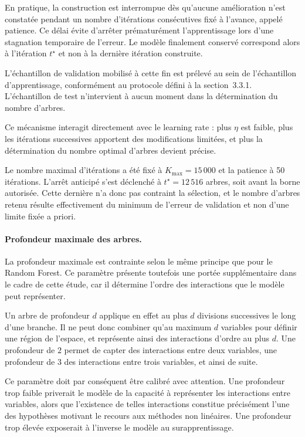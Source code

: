 En pratique, la construction est interrompue dès qu'aucune amélioration n'est constatée 
pendant un nombre d'itérations consécutives fixé à l'avance, appelé patience. Ce délai 
évite d'arrêter prématurément l'apprentissage lors d'une stagnation temporaire de 
l'erreur. Le modèle finalement conservé correspond alors à l'itération $t^{\star}$ et non 
à la dernière itération construite.

L'échantillon de validation mobilisé à cette fin est prélevé au sein de l'échantillon 
d'apprentissage, conformément au protocole défini à la section~3.3.1. L'échantillon de 
test n'intervient à aucun moment dans la détermination du nombre d'arbres.

Ce mécanisme interagit directement avec le learning rate : plus $\eta$ est 
faible, plus les itérations successives apportent des modifications limitées, et plus la 
détermination du nombre optimal d'arbres devient précise.

Le nombre maximal d'itérations a été fixé à \(K_{\max} = 15\,000\) et la
patience à 50 itérations. L'arrêt anticipé s'est déclenché à
\(t^{\star} = 12\,516\) arbres, soit avant la borne autorisée. Cette dernière
n'a donc pas contraint la sélection, et le nombre d'arbres retenu résulte
effectivement du minimum de l'erreur de validation et non d'une limite fixée
a priori.

\paragraph{Profondeur maximale des arbres.}
La profondeur maximale est contrainte selon le même principe que pour le Random Forest. 
Ce paramètre présente toutefois une portée supplémentaire dans le cadre de cette étude, 
car il détermine l'ordre des interactions que le modèle peut représenter.

Un arbre de profondeur $d$ applique en effet au plus $d$ divisions successives le long 
d'une branche. Il ne peut donc combiner qu'au maximum $d$ variables pour définir une 
région de l'espace, et représente ainsi des interactions d'ordre au plus $d$. Une 
profondeur de $2$ permet de capter des interactions entre deux variables, une profondeur 
de $3$ des interactions entre trois variables, et ainsi de suite.

Ce paramètre doit par conséquent être calibré avec attention. Une profondeur trop faible 
priverait le modèle de la capacité à représenter les interactions entre variables, alors 
que l'existence de telles interactions constitue précisément l'une des hypothèses 
motivant le recours aux méthodes non linéaires. Une profondeur trop 
élevée exposerait à l'inverse le modèle au surapprentissage.

